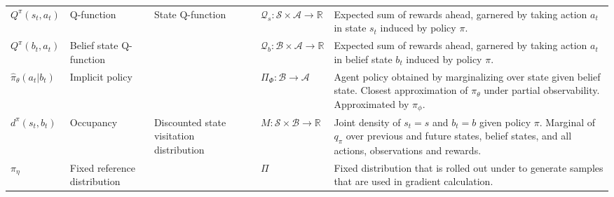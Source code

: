 \begin{minipage}{\textwidth}
\begin{adjustwidth}{-.5in}{-.5in}
\begin{center}
\begin{tabular}{@{}p{2cm}p{2cm}p{2cm}p{3cm}p{6.5cm}@{}}
$Q^{\pi}(s_t, a_t)$                & Q-function                   & State Q-function                                                & $\mathcal{Q}_s : \mathcal{S} \times \mathcal{A} \rightarrow \mathbb{R}$                                                           & Expected sum of rewards ahead, garnered by taking action $a_t$ in state $s_t$ induced by policy $\pi$.                                                                        \\
$Q^{\pi}(b_t, a_t)$                & Belief state Q-function      &                                                                 & $\mathcal{Q}_b : \mathcal{B} \times \mathcal{A} \rightarrow \mathbb{R}$                                                           & Expected sum of rewards ahead, garnered by taking action $a_t$ in belief state $b_t$ induced by policy $\pi$.                                                                 \\
$\hat{\pi}_{\theta}(a_t | b_t)$    & Implicit policy &                                                                 & $\Pi_{\Phi} : \mathcal{B} \rightarrow \mathcal{A}$                                                                                & Agent policy obtained by marginalizing over state given belief state.   Closest approximation of $\pi_{\theta}$ under partial observability.  Approximated by $\pi_{\phi}$.   \\
$d^{\pi}(s_t, b_t)$                & Occupancy                    & Discounted state visitation distribution~\citep{pmlr-v125-agarwal20a}                                                                & $M : \mathcal{S} \times \mathcal{B} \rightarrow \mathbb{R}$                                                                     & Joint density of $s_t = s$ and $b_t = b$ given policy $\pi$. Marginal of $q_{\pi}$ over previous and future states, belief states, and all actions, observations and rewards. \\
$\pi_{\eta}$                & Fixed reference distribution                    &                                                                 & $\Pi$                                                                     & Fixed distribution that is rolled out under to generate samples that are used in gradient calculation. \\\hline
\end{tabular}
\end{center}
\end{adjustwidth}
\label{tab:notation}
\end{minipage}